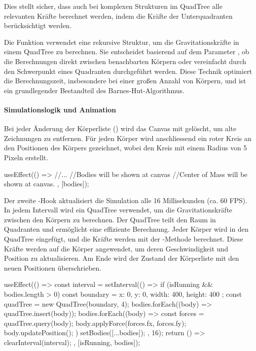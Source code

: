 \documentclass[a4paper,12pt,twoside]{article}
\begin{document}
Dies stellt sicher, dass auch bei komplexen Strukturen im QuadTree alle relevanten Kräfte berechnet werden, indem die Kräfte der Unterquadranten berücksichtigt werden.


Die Funktion  verwendet eine rekursive Struktur, um die Gravitationskräfte in einem QuadTree zu berechnen. Sie entscheidet basierend auf dem Parameter , ob die Berechnungen direkt zwischen benachbarten Körpern oder vereinfacht durch den Schwerpunkt eines Quadranten durchgeführt werden. Diese Technik optimiert die Berechnungszeit, insbesondere bei einer großen Anzahl von Körpern, und ist ein grundlegender Bestandteil des Barnes-Hut-Algorithmus.







\paragraph{Simulationslogik und Animation}

Bei jeder Änderung der Körperliste () wird das Canvas mit  gelöscht, um alte Zeichnungen zu entfernen. Für jeden Körper wird anschliessend ein roter Kreis an den Positionen des Körpers gezeichnet, wobei  den Kreis mit einem Radius von 5 Pixeln erstellt.

\begin{javascript}
    useEffect(() => {
        //...
        //Bodies will be shown at canvas
        //Center of Mass will be shown at canvas.
    }, [bodies]);

\end{javascript}


Der zweite -Hook aktualisiert die Simulation alle 16 Millisekunden (ca. 60 FPS). In jedem Intervall wird ein QuadTree verwendet, um die Gravitationskräfte zwischen den Körpern zu berechnen. Der QuadTree teilt den Raum in Quadranten und ermöglicht eine effiziente Berechnung. Jeder Körper wird in den QuadTree eingefügt, und die Kräfte werden mit der -Methode berechnet. Diese Kräfte werden auf die Körper angewendet, um deren Geschwindigkeit und Position zu aktualisieren. Am Ende wird der Zustand der Körperliste mit den neuen Positionen überschrieben.


\begin{javascript}
useEffect(() => {
    const interval = setInterval(() => {
        if (isRunning && bodies.length > 0) {
            const boundary = { x: 0, y: 0, width: 400, height: 400 };
            const quadTree = new QuadTree(boundary, 4);
            bodies.forEach((body) => quadTree.insert(body));
            bodies.forEach((body) => {
                const forces = quadTree.query(body);
                body.applyForce(forces.fx, forces.fy);
                body.updatePosition();
            })
            setBodies([...bodies]);
        }
    }, 16);
    return () => clearInterval(interval);
}, [isRunning, bodies]);
\end{javascript}
\end{document}
